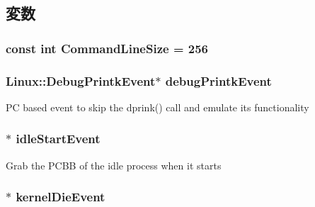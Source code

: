 \subsection{変数}
\hypertarget{classLinuxMipsSystem_a40cf7cde1351c066dee545df2832e4c7}{
\subsubsection[{CommandLineSize}]{\setlength{\rightskip}{0pt plus 5cm}const int {\bf CommandLineSize} = 256}}
\label{classLinuxMipsSystem_a40cf7cde1351c066dee545df2832e4c7}
\hypertarget{classLinuxMipsSystem_aedceac66468548dd7c74a37cb968a83b}{
\subsubsection[{debugPrintkEvent}]{\setlength{\rightskip}{0pt plus 5cm}Linux::DebugPrintkEvent$\ast$ {\bf debugPrintkEvent}}}
\label{classLinuxMipsSystem_aedceac66468548dd7c74a37cb968a83b}
PC based event to skip the dprink() call and emulate its functionality \hypertarget{classLinuxMipsSystem_a063da82d4b5c3e8ea09eeb1d65d0666e}{
\subsubsection[{idleStartEvent}]{$\ast$ {\bf idleStartEvent}}}
\label{classLinuxMipsSystem_a063da82d4b5c3e8ea09eeb1d65d0666e}
Grab the PCBB of the idle process when it starts \hypertarget{classLinuxMipsSystem_a84afa728bab9addbfe1a66374c9093b5}{
\subsubsection[{kernelDieEvent}]{$\ast$ {\bf kernelDieEvent}}}
